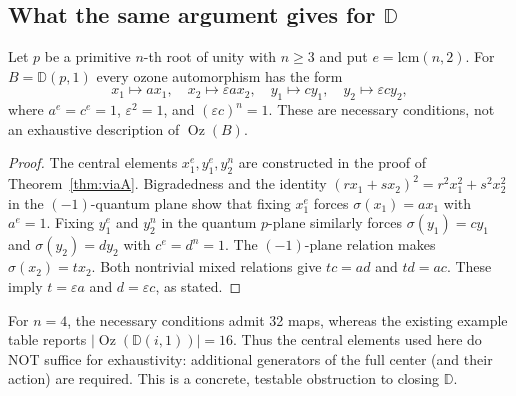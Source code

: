 \subsection{What the same argument gives for $\mathbb D$}
\begin{proposition}\label{prop:Dnecessary}
Let $p$ be a primitive $n$-th root of unity with $n\ge3$ and put
$e=\mathrm{lcm}(n,2)$. For $B=\mathbb D(p,1)$ every ozone automorphism
has the form
\[
 x_1\mapsto a x_1,\quad x_2\mapsto\varepsilon a x_2,\quad
 y_1\mapsto c y_1,\quad y_2\mapsto\varepsilon c y_2,
\]
where $a^e=c^e=1$, $\varepsilon^2=1$, and
$(\varepsilon c)^n=1$. These are necessary conditions, not an
exhaustive description of $\operatorname{Oz}(B)$.
\end{proposition}
\begin{proof}
The central elements $x_1^e,y_1^e,y_2^n$ are constructed in the
proof of Theorem~\ref{thm:viaA}. Bigradedness and the identity
$(r x_1+s x_2)^2=r^2x_1^2+s^2x_2^2$ in the $(-1)$-quantum plane
show that fixing $x_1^e$ forces $\sigma(x_1)=a x_1$ with $a^e=1$.
Fixing $y_1^e$ and $y_2^n$ in the quantum $p$-plane similarly
forces $\sigma(y_1)=c y_1$ and $\sigma(y_2)=d y_2$ with
$c^e=d^n=1$. The $(-1)$-plane relation makes
$\sigma(x_2)=t x_2$. Both nontrivial mixed relations give
$tc=ad$ and $td=ac$. These imply $t=\varepsilon a$ and
$d=\varepsilon c$, as stated.
\end{proof}
\begin{remark}
For $n=4$, the necessary conditions admit 32 maps, whereas the
existing example table reports $|\operatorname{Oz}(\mathbb D(i,1))|=16$.
Thus the central elements used here do NOT suffice for exhaustivity:
additional generators of the full center (and their action) are
required. This is a concrete, testable obstruction to closing $\mathbb D$.
\end{remark}
